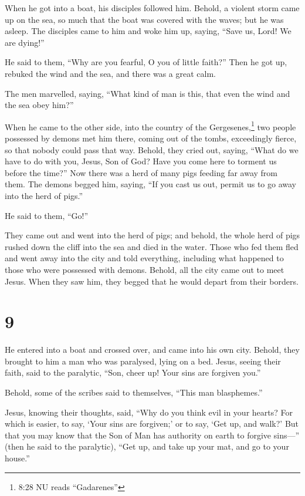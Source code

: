  When he got into a boat, his disciples followed him.
 Behold, a violent storm came up on the sea, so much that
the boat was covered with the waves; but he was asleep. 
The disciples came to him and woke him up, saying, ``Save us, Lord! We
are dying!''

 He said to them, ``Why are you fearful, O you of little
faith?'' Then he got up, rebuked the wind and the sea, and there was a
great calm.

 The men marvelled, saying, ``What kind of man is this,
that even the wind and the sea obey him?''

 When he came to the other side, into the country of the
Gergesenes,\footnote{8:28 NU reads ``Gadarenes''} two people possessed
by demons met him there, coming out of the tombs, exceedingly fierce, so
that nobody could pass that way.  Behold, they cried out,
saying, ``What do we have to do with you, Jesus, Son of God? Have you
come here to torment us before the time?''  Now there was a
herd of many pigs feeding far away from them.  The demons
begged him, saying, ``If you cast us out, permit us to go away into the
herd of pigs.''

 He said to them, ``Go!''

They came out and went into the herd of pigs; and behold, the whole herd
of pigs rushed down the cliff into the sea and died in the water.
 Those who fed them fled and went away into the city and
told everything, including what happened to those who were possessed
with demons.  Behold, all the city came out to meet Jesus.
When they saw him, they begged that he would depart from their borders.

\hypertarget{section-8}{%
\section{9}\label{section-8}}

 He entered into a boat and crossed over, and came into his
own city.  Behold, they brought to him a man who was
paralysed, lying on a bed. Jesus, seeing their faith, said to the
paralytic, ``Son, cheer up! Your sins are forgiven you.''

 Behold, some of the scribes said to themselves, ``This man
blasphemes.''

 Jesus, knowing their thoughts, said, ``Why do you think
evil in your hearts?  For which is easier, to say, `Your
sins are forgiven;' or to say, `Get up, and walk?'  But that
you may know that the Son of Man has authority on earth to forgive
sins---'' (then he said to the paralytic), ``Get up, and take up your
mat, and go to your house.''

